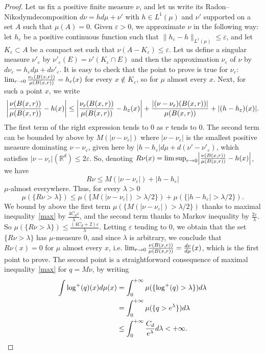 \documentclass[AHL,Unicode,longabstracts,published]{cedram}
\newcommand{\R}{\mathbb{R}}
\newcommand{\ep}{\varepsilon}
\renewcommand*{\to}{\mathchoice{\longrightarrow}{\rightarrow}{\rightarrow}{\rightarrow}}
\let\originalleft\left
\let\originalright\right
\renewcommand{\left}{\mathopen{}\mathclose\bgroup\originalleft}
\renewcommand{\right}{\aftergroup\egroup\originalright}
\newcommand{\R}{\mathbb{R}}
\begin{document}
\begin{proof}
Let us fix a positive finite measure $\nu$, and let us write its Radon--Nikodym\linebreak decomposition $d\nu=hd\mu+ \nu'$ with $h\in L^1(\mu)$ and $\nu'$ supported on a set $A$ such that $\mu(A)=0$. Given $\ep>0$, we approximate $\nu$ in the following way: let $h_\ep$ be a positive continuous function such that $\|h_\ep-h\|_{L^1(\mu)}\leq \ep$, and let $K_\ep\subset A$ be a compact set such that $\nu(A-K_\ep)\leq \ep$. Let us define a singular measure $\nu'_\ep$ by $\nu'_\ep(E)=\nu'(K_\ep\cap E)$ and then the approximation $\nu_\ep$ of $\nu$ by $d\nu_\ep= h_\ep d\mu+ d\nu'_\ep$. It is easy to check that the point to prove is true for $\nu_\ep$: $\lim_{r\to 0}\frac{\nu_\ep(B(x,r))}{\mu(B(x,r))}=h_\ep(x)$ for every $x\not\in K_\ep$, so for $\mu$ almost every $x$. Next, for such a point $x$, we write
\[
\left|\frac{\nu(B(x,r))}{\mu(B(x,r))}-h(x)\right|\leq \left|\frac{\nu_\ep(B(x,r))}{\mu(B(x,r))}-h_\ep(x)\right|+\frac{|(\nu-\nu_\ep)(B(x,r))|}{\mu(B(x,r))}+|(h-h_\ep)(x)|.
\]
The first term of the right expression tends to $0$ as $r$ tends to $0$. The second term can be bounded by above by $M(|\nu-\nu_\ep|)$ where $|\nu-\nu_\ep|$ is the smallest positive measure dominating $\nu-\nu_\ep$, given here by $|h-h_\ep|d\mu+d(\nu'-\nu'_\ep)$, which satisfies $|\nu-\nu_\ep|(\R^d)\leq 2\ep$. So, denoting $R\nu(x)=\limsup_{r\to 0} \left|\frac{\nu(B(x,r))}{\mu(B(x,r))}-h(x)\right|$, we have
\[
R\nu\leq M(|\nu-\nu_\ep|)+|h-h_\ep|
\]
$\mu$-almost everywhere. Thus, for every $\lambda>0$
\[
\mu(\{R\nu>\lambda\})\leq \mu(\{M(|\nu-\nu_\ep|)>\lambda/2\})+\mu(\{|h-h_\ep|>\lambda/2\}).
\]
We bound by above the first term $\mu(\{M(|\nu-\nu_\ep|)>\lambda/2\})$ thanks to maximal inequality~\eqref{max} by $\frac{4C_d\ep}{\lambda}$, and the second term thanks to Markov inequality by $\frac{2\ep}{\lambda}$. So $\mu(\{R\nu>\lambda\})\leq \frac{(4C_d+2)\ep}{\lambda}$. Letting $\ep$ tending to $0$, we obtain that the set $\{R\nu>\lambda\}$ has $\mu$-measure $0$, and since $\lambda$ is arbitrary, we conclude that $R\nu(x)=0$ for $\mu$ almost every $x$, i.e. $\lim_{ r\to 0 } \frac{\nu(B(x,r))}{\mu(B(x,r))}=\frac{d\nu}{d \mu}(x)$, which is the first point to prove. The second point is a straightforward consequence of maximal inequality~\eqref{max} for $q=M\nu$, by writing
\begin{align*}
 \int \log^{+}(q)(x) d\mu(x) &=  \int_0^{+\infty} \mu(\{\log^{+}(q)>\lambda\})d\lambda \\
&=  \int_0^{+\infty} \mu(\{q>e^\lambda\})d\lambda \\
&\leq  \int_0^{+\infty} \frac{C_d}{e^{\lambda}}d \lambda < +\infty.\qedhere
\end{align*}
\end{proof}
\end{document}
